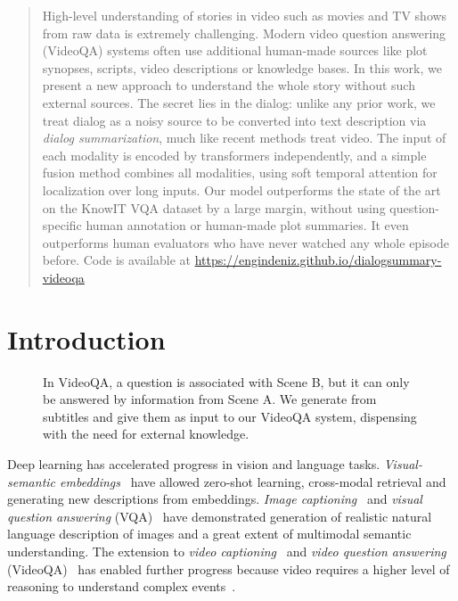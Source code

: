 \documentclass[10pt,twocolumn,letterpaper]{article}
\begin{document}
\newcommand{\tok}{\operatorname{tok}}
\newcommand{\att}{\text{att}}
\newcommand{\best}[1]{{\color{red!60!black}{#1}}}
 
\begin{abstract}
High-level understanding of stories in video such as movies and TV shows from raw data is extremely challenging. Modern video question answering (VideoQA) systems often use additional human-made sources like plot synopses, scripts, video descriptions or knowledge bases. In this work, we present a new approach to understand the whole story without such external sources. The secret lies in the dialog: unlike any prior work, we treat dialog as a noisy source to be converted into text description via \emph{dialog summarization}, much like recent methods treat video. The input of each modality is encoded by transformers independently, and a simple fusion method combines all modalities, using soft temporal attention for localization over long inputs. Our model outperforms the state of the art on the KnowIT VQA dataset by a large margin, without using question-specific human annotation or human-made plot summaries. It even outperforms human evaluators who have never watched any whole episode before. Code is available at \url{https://engindeniz.github.io/dialogsummary-videoqa}
\end{abstract}

\section{Introduction}
\label{sec:intro}

\begin{figure}
\begin{center}
\end{center}
\caption{In VideoQA, a question is associated with Scene B, but it can only be answered by information from Scene A. We generate \episodeSums from subtitles and give them as input to our VideoQA system, dispensing with the need for external knowledge.}
\label{fig:idea}
\end{figure}


Deep learning has accelerated progress in vision and language tasks. \emph{Visual-semantic embeddings}~\cite{kiros2014unifying,FCS+13} have allowed zero-shot learning, cross-modal retrieval and generating new descriptions from embeddings. \emph{Image captioning}~\cite{vinyals2015show} and \emph{visual question answering }(VQA)~\cite{AAL+15} have demonstrated generation of realistic natural language description of images and a great extent of multimodal semantic understanding. The extension to \emph{video captioning}~\cite{Krishna_2017_ICCV,venugopalan2015sequence} and \emph{video question answering} (VideoQA)~\cite{TZS+16,lei2018tvqa} has enabled further progress because video requires a higher level of reasoning to understand complex events~\cite{zellers2019recognition}.
\end{document}
